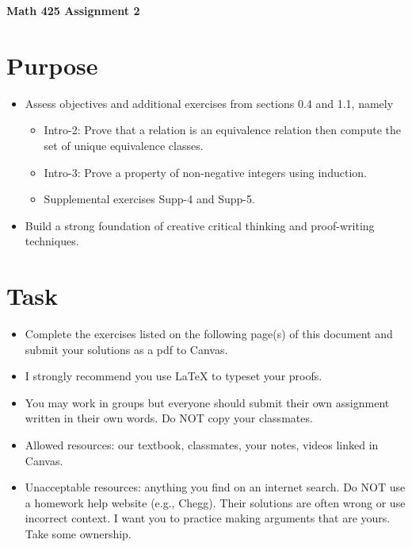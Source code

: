 \documentclass[12pt]{article}
\begin{document}
	\begin{center}
		{\Large \bf Math 425 Assignment 2}
	\end{center}
	\section*{Purpose}
		\begin{itemize}
			\item Assess objectives and additional exercises from sections 0.4 and 1.1, namely
				\begin{itemize}
					\item Intro-2: Prove that a relation is an equivalence relation then compute the set of unique equivalence classes.
					\item Intro-3: Prove a property of non-negative integers using induction.
					\item Supplemental exercises Supp-4 and Supp-5. 
				\end{itemize}
			\item Build a strong foundation of creative critical thinking and proof-writing techniques.
		\end{itemize}
	\section*{Task}
		\begin{itemize}
			\item Complete the exercises listed on the following page(s) of this document and submit your solutions as a pdf to Canvas.
			\item I strongly recommend you use LaTeX to typeset your proofs.
			\item You may work in groups but everyone should submit their own assignment written in their own words.  Do NOT copy your classmates.
			\item Allowed resources: our textbook, classmates, your notes, videos linked in Canvas.
			\item Unacceptable resources: anything you find on an internet search. Do NOT use a homework help website (e.g., Chegg). Their solutions are often wrong or use incorrect context.  I want you to practice making arguments that are yours. Take some ownership.
		\end{itemize}
\end{document}
